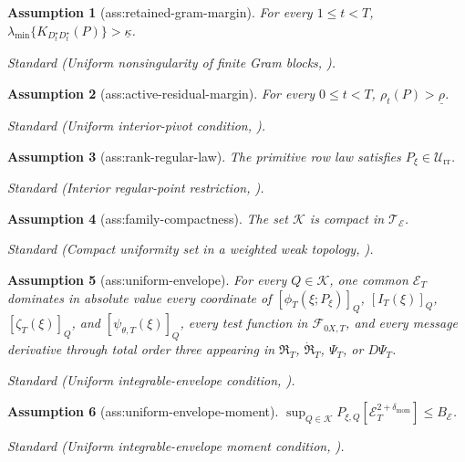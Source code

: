 \documentclass{article}
\newtheorem{assumption}{Assumption}
\begin{document}
\begin{assumption}[ass:retained-gram-margin]\label{ass:retained-gram-margin}
For every \(1\le t<T\), \(\lambda_{\min}\{K_{D_t^{\star}D_t^{\star}}(P)\}>\underline\kappa\).
\par\smallskip\noindent\emph{Standard} (Uniform nonsingularity of finite Gram blocks, \cite{NeweyMcFadden1994LargeSample}).
\end{assumption}

\begin{assumption}[ass:active-residual-margin]\label{ass:active-residual-margin}
For every \(0\le t<T\), \(\rho_t(P)>\underline\rho\).
\par\smallskip\noindent\emph{Standard} (Uniform interior-pivot condition, \cite{NeweyMcFadden1994LargeSample}).
\end{assumption}

\begin{assumption}[ass:rank-regular-law]\label{ass:rank-regular-law}
The primitive row law satisfies \(P_\xi\in\mathcal U_{\mathrm{rr}}\).
\par\smallskip\noindent\emph{Standard} (Interior regular-point restriction, \cite{VanDerVaartWellner1996WeakConvergence}).
\end{assumption}

\begin{assumption}[ass:family-compactness]\label{ass:family-compactness}
The set \(\mathcal K\) is compact in \(\mathcal T_{\mathcal E}\).
\par\smallskip\noindent\emph{Standard} (Compact uniformity set in a weighted weak topology, \cite{VanDerVaartWellner1996WeakConvergence}).
\end{assumption}

\begin{assumption}[ass:uniform-envelope]\label{ass:uniform-envelope}
For every \(Q\in\mathcal K\), one common \(\mathcal E_T\) dominates in absolute value every coordinate of \([\phi_T(\xi;P_\xi)]_Q\), \([I_T(\xi)]_Q\), \([\zeta_T(\xi)]_Q\), and \([\psi_{\theta,T}(\xi)]_Q\), every test function in \(\mathcal F_{0X,T}\), and every message derivative through total order three appearing in \(\mathfrak R_T\), \(\dot{\mathfrak R}_T\), \(\Psi_T\), or \(D\Psi_T\).
\par\smallskip\noindent\emph{Standard} (Uniform integrable-envelope condition, \cite{VanDerVaartWellner1996WeakConvergence}).
\end{assumption}

\begin{assumption}[ass:uniform-envelope-moment]\label{ass:uniform-envelope-moment}
\(\sup_{Q\in\mathcal K}P_{\xi,Q}[\mathcal E_T^{2+\delta_{\mathrm{mom}}}]\le B_{\mathcal E}\).
\par\smallskip\noindent\emph{Standard} (Uniform integrable-envelope moment condition, \cite{VanDerVaartWellner1996WeakConvergence}).
\end{assumption}
\end{document}
